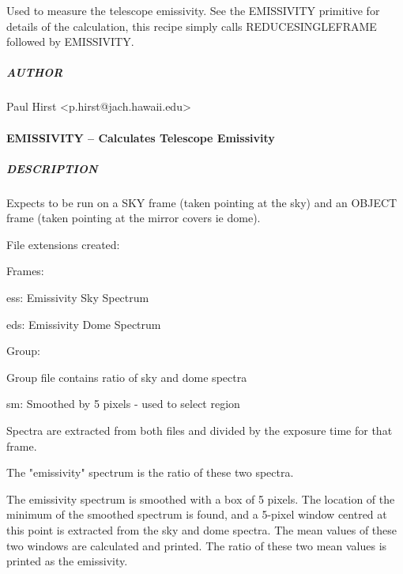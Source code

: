 \documentclass[twoside,11pt]{article}
\renewcommand{\_}{\texttt{\symbol{95}}}
\begin{document}
Used to measure the telescope emissivity. See the \_EMISSIVITY\_
primitive for details of the calculation, this recipe simply calls
\_REDUCE\_SINGLE\_FRAME\_ followed by \_EMISSIVITY\_.

\subparagraph*{AUTHOR\label{EMISSIVITY_--_a_recipe_to_measure_telescope_emissivity_AUTHOR}}

Paul Hirst <p.hirst@jach.hawaii.edu>


\paragraph*{\_EMISSIVITY\_ -- Calculates Telescope Emissivity\label{_EMISSIVITY_--_Calculates_Telescope_Emissivity}}



\subparagraph*{DESCRIPTION\label{_EMISSIVITY_--_Calculates_Telescope_Emissivity_DESCRIPTION}}

Expects to be run on a SKY frame (taken pointing at the sky) and an
OBJECT frame (taken pointing at the mirror covers ie dome).



File extensions created:



Frames:



\_ess: Emissivity Sky Spectrum



\_eds: Emissivity Dome Spectrum



Group:



Group file contains ratio of sky and dome spectra



\_sm: Smoothed by 5 pixels - used to select region



Spectra are extracted from both files and divided by the exposure time
for that frame.



The "emissivity" spectrum is the ratio of these two spectra.



The emissivity spectrum is smoothed with a box of 5 pixels.  The
location of the minimum of the smoothed spectrum is found, and a
5-pixel window centred at this point is extracted from the sky and
dome spectra.  The mean values of these two windows are calculated and
printed.  The ratio of these two mean values is printed as the
emissivity.
\end{document}

